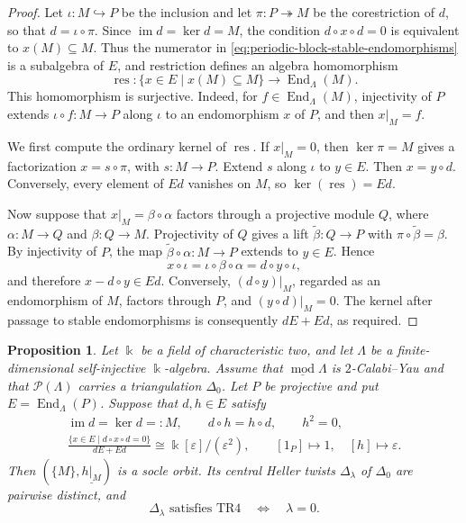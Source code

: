 \documentclass[a4paper,11pt,reqno]{amsart}
\newtheorem{proposition}[proposition]{Proposition}
\theoremstyle{definition}
\theoremstyle{plain}
\numberwithin{equation}{section}
\newcommand{\im}{\operatorname{im}}
\newcommand{\End}{\operatorname{End}}
\newcommand{\kk}{\Bbbk}
\begin{document}
\begin{proof}
Let \(\iota:M\hookrightarrow P\) be the inclusion and let
\(\pi:P\twoheadrightarrow M\) be the corestriction of \(d\), so
that \(d=\iota\circ\pi\).  Since \(\im d=\ker d=M\),
the condition \(d\circ x\circ d=0\) is equivalent to
\(x(M)\subseteq M\).  Thus the numerator in
\eqref{eq:periodic-block-stable-endomorphisms} is a subalgebra of
\(E\), and restriction defines an algebra homomorphism
\[
 \operatorname{res}:
 \{x\in E\mid x(M)\subseteq M\}\longrightarrow\End_\Lambda(M).
\]
This homomorphism is surjective.  Indeed, for
\(f\in\End_\Lambda(M)\), injectivity of \(P\) extends
\(\iota\circ f:M\to P\) along \(\iota\) to an endomorphism
\(x\) of \(P\), and then \(x|_M=f\).

We first compute the ordinary kernel of \(\operatorname{res}\).
If \(x|_M=0\), then \(\ker\pi=M\) gives a factorization
\(x=s\circ\pi\), with \(s:M\to P\).  Extend \(s\) along
\(\iota\) to \(y\in E\).  Then \(x=y\circ d\).
Conversely, every element of \(Ed\) vanishes on \(M\), so
\(\ker(\operatorname{res})=Ed\).

Now suppose that \(x|_M=\beta\circ\alpha\) factors through a
projective module \(Q\), where \(\alpha:M\to Q\) and
\(\beta:Q\to M\).  Projectivity of \(Q\) gives a lift
\(\widetilde\beta:Q\to P\) with
\(\pi\circ\widetilde\beta=\beta\).  By injectivity of \(P\),
the map \(\widetilde\beta\circ\alpha:M\to P\) extends to
\(y\in E\).  Hence
\[
 x\circ\iota
 =\iota\circ\beta\circ\alpha
 =d\circ y\circ\iota,
\]
and therefore \(x-d\circ y\in Ed\).
Conversely, \((d\circ y)|_M\), regarded as an endomorphism of
\(M\), factors through \(P\), and \((y\circ d)|_M=0\).
The kernel after passage to stable endomorphisms is consequently
\(dE+Ed\), as required.
\end{proof}

\begin{proposition}
\label{prop:strict-period-one-detector}
Let \(\kk\) be a field of characteristic two, and let \(\Lambda\) be a
finite-dimensional self-injective \(\kk\)-algebra.  Assume that
\(\underline{\operatorname{mod}}\Lambda\) is \(2\)-Calabi--Yau
and that \(\mathcal P(\Lambda)\) carries a triangulation
\(\Delta_0\).  Let \(P\) be projective and put
\(E=\End_\Lambda(P)\).  Suppose that \(d,h\in E\) satisfy
\begin{equation}
\label{eq:ade-block-certificate}
\begin{gathered}
 \im d=\ker d=:M,\qquad d\circ h=h\circ d,\qquad h^2=0,\\
 \frac{\{x\in E\mid d\circ x\circ d=0\}}{dE+Ed}
 \cong\kk[\varepsilon]/(\varepsilon^2),
 \qquad [1_P]\longmapsto1,\quad[h]\longmapsto\varepsilon.
\end{gathered}
\end{equation}
Then \((\{M\},\underline{h|_M})\) is a socle orbit.  Its central
Heller twists \(\Delta_\lambda\) of \(\Delta_0\) are pairwise
distinct, and
\[
 \Delta_\lambda\text{ satisfies }\mathrm{TR4}
 \quad\Longleftrightarrow\quad\lambda=0.
\]
\end{proposition}
\end{document}
